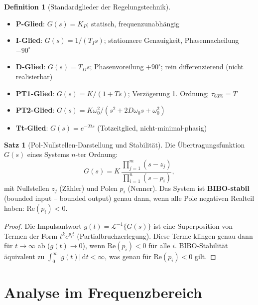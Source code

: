 ﻿\documentclass[a4paper,12pt]{report}
\theoremstyle{definition}
\newtheorem{definition}{Definition}
\newtheorem{satz}{Satz}
\begin{document}
\begin{definition}[Standardglieder der Regelungstechnik]
\begin{itemize}
    \item[-] \textbf{P-Glied}: $G(s) = K_P$; statisch, frequenzunabh\"angig
    \item[-] \textbf{I-Glied}: $G(s) = 1/(T_I s)$; stationaere Genauigkeit, Phasennacheilung $-90^\circ$
    \item[-] \textbf{D-Glied}: $G(s) = T_D s$; Phasenvoreilung $+90^\circ$; rein differenzierend (nicht realisierbar)
    \item[-] \textbf{PT1-Glied}: $G(s) = K/(1+Ts)$; Verz\"ogerung 1. Ordnung; $\tau_{63\%} = T$
    \item[-] \textbf{PT2-Glied}: $G(s) = K\omega_0^2/(s^2 + 2D\omega_0 s + \omega_0^2)$
    \item[-] \textbf{Tt-Glied}: $G(s) = e^{-Tt s}$ (Totzeitglied, nicht-minimal-phasig)
\end{itemize}
\end{definition}

\begin{satz}[Pol-Nullstellen-Darstellung und Stabilit\"at]
Die \"Ubertragungsfunktion $G(s)$ eines Systems $n$-ter Ordnung:
\[
  G(s) = K\,\frac{\prod_{j=1}^m (s - z_j)}{\prod_{i=1}^n (s - p_i)},
\]
mit Nullstellen $z_j$ (Z\"ahler) und Polen $p_i$ (Nenner).
Das System ist \textbf{BIBO-stabil} (bounded input -- bounded output)
genau dann, wenn alle Pole negativen Realteil haben: $\text{Re}(p_i) < 0$.
\end{satz}
\begin{proof}
Die Impulsantwort $g(t) = \mathcal{L}^{-1}\{G(s)\}$ ist eine Superposition
von Termen der Form $t^k e^{p_i t}$ (Partialbruchzerlegung).
Diese Terme klingen genau dann f\"ur $t\to\infty$ ab ($g(t) \to 0$),
wenn $\text{Re}(p_i) < 0$ f\"ur alle $i$.
BIBO-Stabilit\"at \"aquivalent zu $\int_0^\infty |g(t)|\,\mathrm{d}t < \infty$,
was genau f\"ur $\text{Re}(p_i) < 0$ gilt.
\end{proof}

\section{Analyse im Frequenzbereich}
\end{document}
